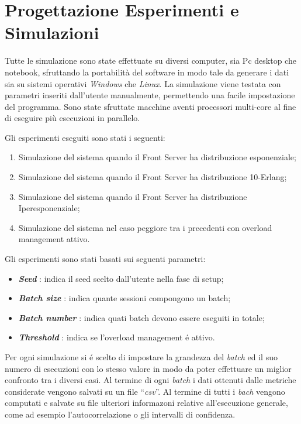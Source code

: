 \chapter{Progettazione Esperimenti e Simulazioni} 

Tutte le simulazione sono state effettuate su diversi computer, sia Pc desktop 
che notebook, sfruttando la portabilit\`a del software in modo tale da generare 
i dati sia su sistemi operativi \textit{Windows} che \textit{Linux}. La 
simulazione viene testata con parametri inseriti dall'utente manualmente, 
permettendo una facile impostazione del programma.
Sono state sfruttate macchine aventi processori multi-core al fine di eseguire 
pi\`u esecuzioni in parallelo.

\noindent Gli esperimenti eseguiti sono stati i seguenti:

\begin{enumerate}
 \item Simulazione del sistema quando il Front Server ha distribuzione 
esponenziale;
 \item Simulazione del sistema quando il Front Server ha distribuzione 
10-Erlang;
 \item Simulazione del sistema quando il Front Server ha distribuzione 
Iperesponenziale;
 \item Simulazione del sistema nel caso peggiore tra i precedenti con overload management attivo.
\end{enumerate}

\noindent \vspace{0.5cm} Gli esperimenti sono stati basati sui seguenti 
parametri:
\begin{itemize}
 \item \textbf{\textit{Seed}} : indica il seed scelto dall'utente nella fase di setup;
 \item \textbf{\textit{Batch size}} : indica quante sessioni compongono un batch;
 \item \textbf{\textit{Batch number}} : indica quati batch devono essere eseguiti in totale;
 \item \textbf{\textit{Threshold}} : indica se l'overload management \'e attivo.
\end{itemize}

Per ogni simulazione si \'e scelto di impostare la grandezza del \textit{batch} 
ed il suo numero di esecuzioni con lo stesso valore in modo da poter effettuare
un miglior confronto tra i diversi casi. Al termine di ogni \textit{batch} i dati 
ottenuti dalle metriche considerate vengono salvati su un file ``\textit{csv}''.
Al termine di tutti i \textit{bach} vengono computati e salvate su file ulteriori 
informazoni relative all'esecuzione generale, come ad esempio l'autocorrelazione o
gli intervalli di confidenza.